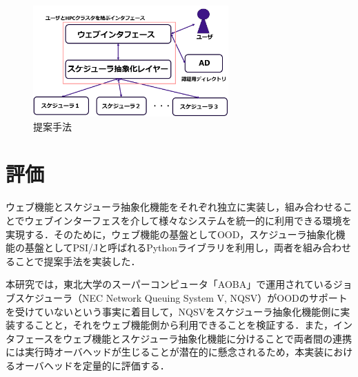 \documentclass[a4paper,oneside,twocolumn,notitlepage,dvipdfmx]{jsarticle}
\begin{document}
\begin{figure}[h]
  \centering
  \includegraphics[width=75mm]{./fig/fig1.png}
  \caption{提案手法}
  \label{fig1}
\end{figure}

\section{評価}
ウェブ機能とスケジューラ抽象化機能をそれぞれ独立に実装し，組み合わせることでウェブインターフェスを介して様々なシステムを統一的に利用できる環境を実現する．そのために，ウェブ機能の基盤としてOOD，スケジューラ抽象化機能の基盤としてPSI/J\cite{citation_6}と呼ばれるPythonライブラリを利用し，両者を組み合わせることで提案手法を実装した．\par
本研究では，東北大学のスーパーコンピュータ「AOBA」で運用されているジョブスケジューラ（NEC Network Queuing System V, NQSV）がOODのサポートを受けていないという事実に着目して，NQSVをスケジューラ抽象化機能側に実装することと，それをウェブ機能側から利用できることを検証する．また，インタフェースをウェブ機能とスケジューラ抽象化機能に分けることで両者間の連携には実行時オーバヘッドが生じることが潜在的に懸念されるため，本実装におけるオーバヘッドを定量的に評価する．\par
\end{document}
